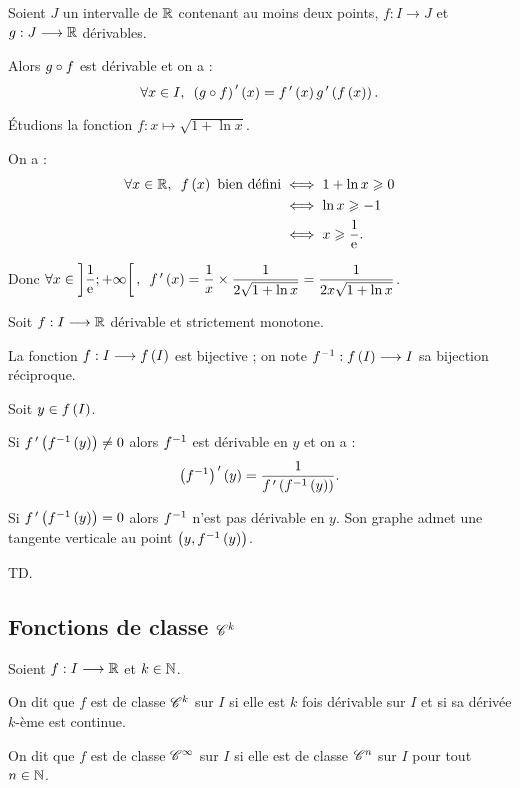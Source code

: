 \begin{cor}
Soient \(J\) un intervalle de \(\mathbb{R}\) contenant au moins deux points, \(f:I\to J\) et \(g:J\longrightarrow\mathbb{R}\) dérivables.

Alors \(g\circ f\) est dérivable et on a : \[\quantifs{\forall x\in I}\paren{g\rond f}\prim\paren{x}=f\prim\paren{x}g\prim\paren{f\paren{x}}.\]
\end{cor}

\begin{ex}
Étudions la fonction \(f:x\mapsto\sqrt{1+\ln x}\).

On a : \[\begin{aligned}
\quantifs{\forall x\in\R}f\paren{x}\text{ bien défini}&\ssi1+\ln x\geq0 \\
&\ssi\ln x\geq-1 \\
&\ssi x\geq\dfrac{1}{\e{}}.
\end{aligned}\]

Donc \(\quantifs{\forall x\in\intervee{\dfrac{1}{\e{}}}{\pinf}}f\prim\paren{x}=\dfrac{1}{x}\times\dfrac{1}{2\sqrt{1+\ln x}}=\dfrac{1}{2x\sqrt{1+\ln x}}\).
\end{ex}

\begin{theo}
Soit \(f:I\longrightarrow\mathbb{R}\) dérivable et strictement monotone.

La fonction \(f:I\longrightarrow f\left(I\right)\) est bijective ; on note \(f^{-1}:f\left(I\right)\longrightarrow I\) sa bijection réciproque.

Soit \(y\in f\left(I\right)\).

Si \(f^{\,\prime}\left(f^{-1}\left(y\right)\right)\not=0\) alors \(f^{-1}\) est dérivable en \(y\) et on a : \[\left(f^{-1}\right)^{\,\prime}\left(y\right)=\dfrac{1}{f^{\,\prime}\left(f^{-1}\left(y\right)\right)}.\]

Si \(f^{\,\prime}\left(f^{-1}\left(y\right)\right)=0\) alors \(f^{-1}\) n'est pas dérivable en \(y\). Son graphe admet une tangente verticale au point \(\left(y,f^{-1}\left(y\right)\right)\).
\end{theo}

\begin{dem}
\Cf TD.
\end{dem}

\subsection{Fonctions de classe \(\mathscr{C}^{k}\)}

\begin{defi}
Soient \(f:I\longrightarrow\mathbb{R}\) et \(k\in\mathbb{N}\).

On dit que \(f\) est de classe \(\mathscr{C}^{k}\) sur \(I\) si elle est \(k\) fois dérivable sur \(I\) et si sa dérivée \(k\)-ème est continue.

On dit que \(f\) est de classe \(\mathscr{C}^{\infty}\) sur \(I\) si elle est de classe \(\mathscr{C}^{n}\) sur \(I\) pour tout \(n\in\mathbb{N}\).
\end{defi}

